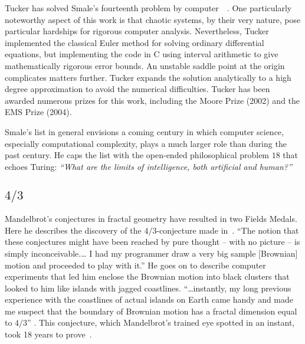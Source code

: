 \documentclass{llncs}
\begin{document}
Tucker has solved Smale's fourteenth problem by
computer~\cite{Tuc02}~\cite{St00}.  One particularly noteworthy aspect
of this work is that chaotic systems, by their very nature, pose
particular hardships for rigorous computer analysis.  Nevertheless,
Tucker implemented the classical Euler method for solving ordinary
differential equations, but implementing the code in C using interval
arithmetic to give mathematically rigorous error bounds.  An unstable
saddle point at the origin complicates matters further. Tucker expands the
solution analytically to a high degree approximation to avoid the
numerical difficulties.  Tucker has been awarded numerous prizes for
this work, including the Moore Prize (2002) and the EMS Prize (2004).

Smale's list in general envisions a coming century in which computer
science, especially computational complexity, plays a much larger
role than during the past century. He caps the list with the
open-ended philosophical problem $18$ that echoes Turing: {\it
  ``What are the limits of intelligence, both artificial and human?''}


\subsection{$4/3$}
Mandelbrot's conjectures in fractal geometry have resulted in two
Fields Medals.  Here he describes the discovery of the
$4/3$-conjecture made in~\cite{ManFN}.  
``The notion that these conjectures might have been reached by pure
  thought -- with no picture -- is simply inconceivable.\dots
I had my programmer draw a very big sample [Brownian] motion and
  proceeded to play with it.''
He goes on to describe computer experiments that led him
enclose the Brownian motion into black clusters that looked to him like islands with
jagged coastlines.
%
``\dots instantly, my long previous experience with the coastlines of
  actual islands on Earth came handy and made me suspect that the
  boundary of Brownian motion has a fractal dimension equal to $4/3$''
\cite{Man}.
%
%
This conjecture, which  Mandelbrot's trained eye spotted in an instant,
took 18 years to prove~\cite{LSW01}.
\end{document}

